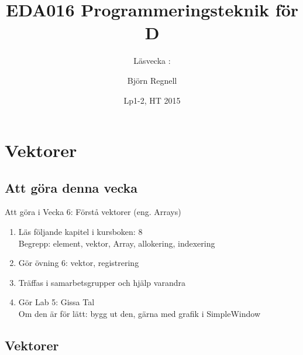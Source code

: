 \documentclass{lecturenotes}
\title[Föreläsningsanteckningar EDA016, 2015]{EDA016 Programmeringsteknik för D}
\subtitle{Läsvecka \vecka: \tema}
\author{Björn Regnell}
\institute{Datavetenskap, LTH}
\date{Lp1-2, HT 2015}
\renewcommand{\vecka}{6}
\newcommand{\tema}{Vektorer}
\begin{document}
\frame{\titlepage}
\setnextsection{\vecka}
\section[Vecka \vecka: \tema]{\tema}
\frame{\tableofcontents}


\subsection{Att göra denna vecka}
\begin{Slide}{Att göra i Vecka \vecka: Förstå vektorer (eng. Arrays)}
\begin{enumerate}
\item Läs följande kapitel i kursboken: 8 \\  
Begrepp: element, vektor, Array, allokering, indexering
\item Gör övning 6: vektor, registrering
\item Träffas i samarbetsgrupper och hjälp varandra 
\item Gör Lab 5: Gissa Tal \\ Om den är för lätt: bygg ut den, gärna med grafik i SimpleWindow
\end{enumerate}
\end{Slide}

\subsection{Vektorer}
\end{document}
